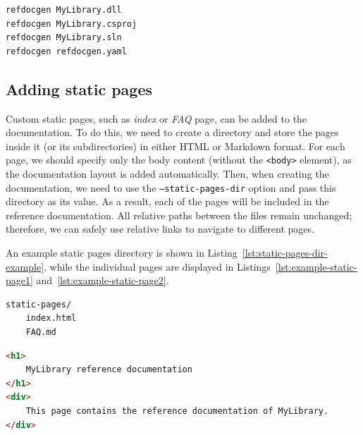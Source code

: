 \newpage

\begin{listing}[H]
\begin{lstlisting}[language=HTML]
refdocgen MyLibrary.dll
refdocgen MyLibrary.csproj
refdocgen MyLibrary.sln
refdocgen refdocgen.yaml
\end{lstlisting}
\caption{\texttt{refdocgen} -- basic usage}
\label{lst:cmd-line-simple-example}
\end{listing}

\subsection{Adding static pages}
\label{sec:user-docs-static-pages}

Custom static pages, such as \textit{index} or \textit{FAQ} page, can be added to the documentation.
To do this, we need to create a directory and
store the pages inside it (or its subdirectories) in either HTML or Markdown format.
For each page, we should specify only the body content (without the \texttt{<body>} element), as the documentation layout is added automatically.
Then, when creating the documentation, we need to use the \texttt{--static-pages-dir} option and pass this directory as its value.
As a result, each of the pages will be included in the reference documentation.
All relative paths between the files remain unchanged; therefore, we can safely use relative links to navigate to different pages.

An example static pages directory is shown in Listing~\ref{lst:static-pages-dir-example}, while
the individual pages are displayed in Listings~\ref{lst:example-static-page1} and~\ref{lst:example-static-page2}.

\begin{listing}[H]
\begin{lstlisting}[language=HTML]
static-pages/
    index.html
    FAQ.md
\end{lstlisting}
\caption{Example static pages directory}
\label{lst:static-pages-dir-example}
\end{listing}

\begin{listing}[H]
\begin{lstlisting}[language=HTML]
<h1>
    MyLibrary reference documentation
</h1>
<div>
    This page contains the reference documentation of MyLibrary.
</div>
\end{lstlisting}
\caption{Example static page in HTML}
\label{lst:example-static-page1}
\end{listing}

